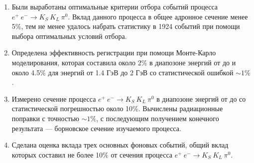 \begin{enumerate}
  \item Были выработаны оптимальные критерии отбора событий процесса ${e^+\:e^- \to K_{S}\:K_{L}\:\pi^0}$. Вклад данного процесса в общее адронное сечение менее 5\%, тем не менее удалось набрать статистику в 1924 событий при помощи выбора оптимальных условий отбора.
  \item Определена эффективность регистрации при помощи Монте-Карло моделирования, которая составила около 2\% в диапозоне энергий от  до  и около 4.5\% для энергий от 1.4 ГэВ до 2 ГэВ со статистической ошибкой $\sim1\%$.
  \item Измерено сечение процесса ${e^+\:e^- \to K_{S}\:K_{L}\:\pi^0}$ в диапозоне энергий от  до  со статистической погрешностью около 10\%. Вычислены радиационные поправки с точностью $\sim1\%$, с последующим получением конечного результата --- борновское сечение изучаемого процесса.
  \item Сделана оценка вклада трех основных фоновых событий, общий вклад которых составил не более 10\% от сечения процесса ${e^+\:e^- \to K_{S}\:K_{L}\:\pi^0}$.
\end{enumerate}
